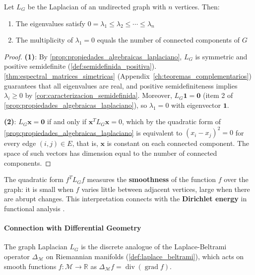 \begin{proposition}\label{prop:propiedades_espectrales_laplaciano_grafos}
	Let $L_G$ be the Laplacian of an undirected graph with $n$ vertices. Then:
	\begin{enumerate}
		\item The eigenvalues satisfy $0 = \lambda_1 \leq \lambda_2 \leq \cdots \leq \lambda_n$
		\item The multiplicity of $\lambda_1 = 0$ equals the number of connected components of $G$
	\end{enumerate}
\end{proposition}

\begin{proof}
	\textbf{(1)}: By \autoref{prop:propiedades_algebraicas_laplaciano}, $L_G$ is symmetric and positive semidefinite (\autoref{def:semidefinida_positiva}). \autoref{thm:espectral_matrices_simetricas} (Appendix~\ref{ch:teoremas_complementarios}) guarantees that all eigenvalues are real, and positive semidefiniteness implies $\lambda_i \geq 0$ by \autoref{cor:caracterizacion_semidefinida}. Moreover, $L_G \mathbf{1} = \mathbf{0}$ (item 2 of \autoref{prop:propiedades_algebraicas_laplaciano}), so $\lambda_1 = 0$ with eigenvector $\mathbf{1}$.

	\textbf{(2)}: $L_G \mathbf{x} = \mathbf{0}$ if and only if $\mathbf{x}^T L_G \mathbf{x} = 0$, which by the quadratic form of \autoref{prop:propiedades_algebraicas_laplaciano} is equivalent to $(x_i - x_j)^2 = 0$ for every edge $(i,j) \in E$, that is, $\mathbf{x}$ is constant on each connected component. The space of such vectors has dimension equal to the number of connected components.
\end{proof}

The quadratic form $f^T L_G f$ measures the \textbf{smoothness} of the function $f$ over the graph: it is small when $f$ varies little between adjacent vertices, large when there are abrupt changes. This interpretation connects with the \textbf{Dirichlet energy} in functional analysis \citep[Ch.~1]{Chung1997}.

\paragraph{Connection with Differential Geometry}

The graph Laplacian $L_G$ is the discrete analogue of the Laplace-Beltrami operator $\Delta_\mathcal{M}$ on Riemannian manifolds (\autoref{def:laplace_beltrami}), which acts on smooth functions $f: \mathcal{M} \to \mathbb{R}$ as $\Delta_\mathcal{M} f = \operatorname{div}(\operatorname{grad} f)$.

